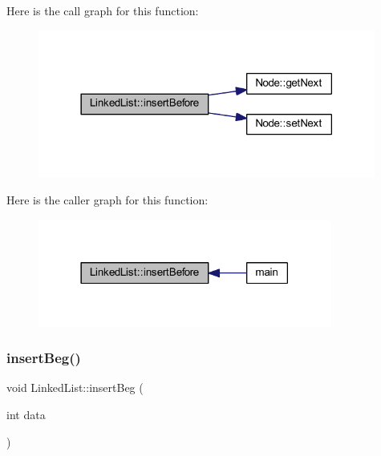 Here is the call graph for this function\+:
\nopagebreak
\begin{figure}[H]
\begin{center}
\leavevmode
\includegraphics[width=314pt]{class_linked_list_a895ad950cc619c9cf72273e5e59a100f_cgraph}
\end{center}
\end{figure}
Here is the caller graph for this function\+:
\nopagebreak
\begin{figure}[H]
\begin{center}
\leavevmode
\includegraphics[width=273pt]{class_linked_list_a895ad950cc619c9cf72273e5e59a100f_icgraph}
\end{center}
\end{figure}
\mbox{\label{class_linked_list_a583e4bb42bb128feddb57767863fd28e}} 
\subsubsection{\texorpdfstring{insert\+Beg()}{insertBeg()}}
{\footnotesize\ttfamily void Linked\+List\+::insert\+Beg (\begin{DoxyParamCaption}\item[{int}]{data }\end{DoxyParamCaption})}

